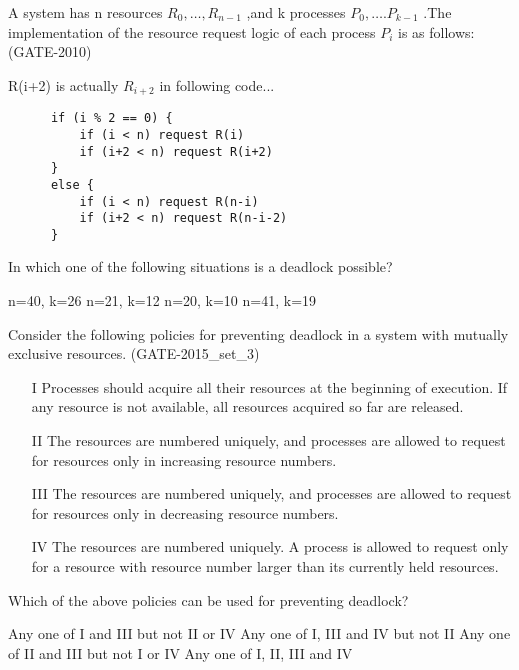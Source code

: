 \begin{questyle}

  \question  A system has n resources {\large \( { R_0,…,R_{n-1}  } \) },and k processes {\large \( { P_0,….P_{k-1} } \) } .The implementation of the resource request logic of each process \(P_i\) is as follows:  (GATE-2010)

  R(i+2) is actually \( R_{i+2} \) in following code...
  \begin{lstlisting}
      if (i % 2 == 0) {
          if (i < n) request R(i)
          if (i+2 < n) request R(i+2)
      }
      else {
          if (i < n) request R(n-i)
          if (i+2 < n) request R(n-i-2)
      }
  \end{lstlisting}

  In which one of the following situations is a deadlock possible?

  \begin{oneparchoices}
    \choice n=40, k=26
    \choice n=21, k=12
    \choice n=20, k=10
    \choice n=41, k=19
  \end{oneparchoices}

  \end{questyle}




\begin{questyle}

  \question  Consider the following policies for preventing deadlock in a system with mutually exclusive resources. (GATE-2015\_set\_3)

  \begin{enumerate}
      \item[I]  Processes should acquire all their resources at the beginning of execution.
                If any resource is not available, all resources acquired so far are released.
      \item[II] The resources are numbered uniquely, and processes are allowed to request
                for resources only in increasing resource numbers.
      \item[III] The resources are numbered uniquely, and processes are allowed to request
                  for resources only in decreasing resource numbers.
      \item[IV]  The resources are numbered uniquely. A process is allowed to request only for a
                  resource with resource number larger than its currently held resources.
  \end{enumerate}
  Which of the above policies can be used for preventing deadlock?

  \begin{choices}
    \choice Any one of I and III but not II or IV
    \choice Any one of I, III and IV but not II
    \choice Any one of II and III but not I or IV
    \choice Any one of I, II, III and IV
  \end{choices}

  \end{questyle}



